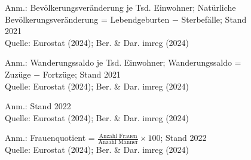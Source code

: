 \begin{figure}[p]
	{\centering {}}
	\label{map:natbevrate}
	\begin{spacing}{1} \scriptsize
		Anm.: Bevölkerungsveränderung je Tsd. Einwohner; Natürliche Bevölkerungsveränderung = Lebendgeburten $-$ Sterbefälle; Stand 2021\\
		Quelle: Eurostat (2024); Ber. \& Dar. imreg (2024) \end{spacing}
\end{figure}


\begin{figure}[p]
	{\centering {}}
	\label{map:wanderung}
	\begin{spacing}{1} \scriptsize
		Anm.: Wanderungssaldo je Tsd. Einwohner; Wanderungssaldo = Zuzüge $-$ Fortzüge; Stand 2021\\
		Quelle: Eurostat (2024); Ber. \& Dar. imreg (2024) \end{spacing}
\end{figure}


\begin{figure}[p]
	{\centering {}}
	\label{map:alter}
	\begin{spacing}{1} \scriptsize
		Anm.: Stand 2022\\
		Quelle: Eurostat (2024); Ber. \& Dar. imreg (2024) \end{spacing}
\end{figure}


\begin{figure}[p]
	{\centering {}}
	\label{map:frauen}
	\begin{spacing}{1} \scriptsize
		Anm.: Frauenquotient = $\frac{\text{Anzahl Frauen}}{\text{Anzahl Männer}} \times 100$; Stand 2022\\
		Quelle: Eurostat (2024); Ber. \& Dar. imreg (2024) \end{spacing}
\end{figure}


